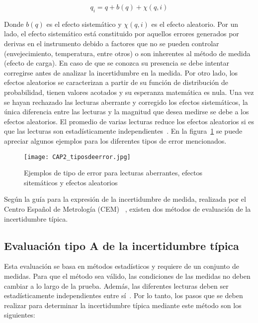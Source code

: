 \begin{equation}
q_i = q + b(q) + \chi(q,i)
\label{eq:lecturamagnitud}
\end{equation}

Donde $b(q)$  es el efecto sistemático y $\chi(q,i)$  es el efecto aleatorio. Por un lado, el efecto sistemático está constituido por aquellos errores generados por derivas en el instrumento debido a factores que no se pueden controlar (envejecimiento, temperatura, entre otros) o son inherentes al método de medida (efecto de carga). En caso de que se conozca su presencia se debe intentar corregirse antes de analizar la incertidumbre en la medida. Por otro lado, los efectos aleatorios se caracterizan a partir de su función de distribución de probabilidad, tienen valores acotados y su esperanza matemática es nula. Una vez se hayan rechazado las lecturas aberrante y corregido los efectos sistemáticos, la única diferencia entre las lecturas y la magnitud que desea medirse se debe a los efectos aleatorios. El promedio de varias lecturas reduce los efectos aleatorios si es que las lecturas son estadísticamente independientes~\cite{Angel2006}. En la figura~\ref{fig:tiposdeerror} se puede apreciar algunos ejemplos para los diferentes tipos de error mencionados.

\begin{figure}[!ht]
\begin{center}
\texttt{[image: CAP2\_tiposdeerror.jpg]}
\caption{Ejemplos de tipo de error para lecturas aberrantes, efectos sitemáticos y efectos aleatorios~\cite{Angel2006}}
\label{fig:tiposdeerror}
\end{center}
\end{figure}

Según la guía para la expresión de la incertidumbre de medida, realizada por el Centro Español de Metrología (CEM) ~\cite{CENTROESPANOLDEMETROLOGIA2008}, existen dos métodos de evaluación de la incertidumbre típica.

	\subsection{Evaluación tipo A de la incertidumbre típica}

	Esta evaluación se basa en métodos estadísticos y requiere de un conjunto de medidas. Para que el método sea válido, las condiciones de las medidas no deben cambiar a lo largo de la prueba. Además, las diferentes lecturas deben ser estadísticamente independientes entre sí~\cite{CENTROESPANOLDEMETROLOGIA2008}. Por lo tanto, los pasos que se deben 			realizar para determinar la incertidumbre típica mediante este método son los siguientes:

